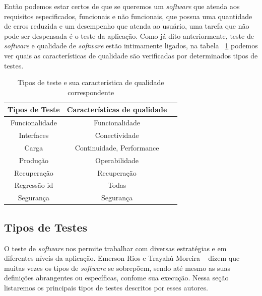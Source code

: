Então podemos estar certos de que se queremos um \textit{software} que atenda aos requisitos especificados, funcionais e não funcionais, que possua uma quantidade de erros reduzida e um desempenho que atenda ao usuário, uma tarefa que não pode ser despensada é o teste da aplicação. Como já dito anteriormente, teste de \textit{software} e qualidade de \textit{software} estão intimamente ligados, na tabela ~\ref{tab:testequalidade} podemos ver quais as características de qualidade são verificadas por determinados tipos de testes.

\begin{table}
	\caption{Tipos de teste e sua característica de qualidade correspondente}
	\begin{center}
	\begin{tabular}{ccc}
		\hline
			\textbf{Tipos de Teste} & \textbf{Características de qualidade} \\
		\hline
			Funcionalidade & Funcionalidade \\
			Interfaces & Conectividade \\
			Carga & Continuidade, Performance \\
			Produção & Operabilidade \\
			Recuperação & Recuperação \\
			Regressão id & Todas \\
			Segurança & Segurança \\
		\hline
	\end {tabular}
	\end{center}
	\label{tab:testequalidade}
\end{table}

\subsection{Tipos de Testes}



O teste de \textit{software} nos permite trabalhar com diversas estratégias e em diferentes níveis da aplicação. Emerson Rios e Trayahú Moreira ~\cite{rios2006teste} dizem que muitas vezes os tipos de \textit{software} se sobrepõem, sendo até mesmo as suas definições abrangentes ou específicas, confome sua execução. Nessa seção listaremos os principais tipos de testes descritos por esses autores.

